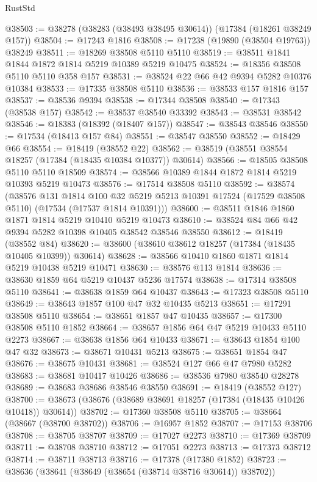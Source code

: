 \begin{lexlean}{RustStd}
\begin{coremodule}
@38503 := @38278 (@38283 (@38493 @38495 @30614)) (@17384 (@18261 @38249 @157))
@38504 := @17243 @1816
@38508 := @17238 (@19890 (@38504 @19763)) @38249
@38511 := @18269 @38508 @5110 @5110
@38519 := @38511 @1841 @1844 @1872 @1814 @5219 @10389 @5219 @10475
@38524 := @18356 @38508 @5110 @5110 @358 @157
@38531 := @38524 @22 @66 @42 @9394 @5282 @10376 @10384
@38533 := @17335 @38508 @5110
@38536 := @38533 @157 @1816 @157
@38537 := @38536 @9394
@38538 := @17344 @38508
@38540 := @17343 (@38538 @157)
@38542 := @38537 @38540 @33392
@38543 := @38531 @38542
@38546 := @18383 (@18392 (@18407 @157))
@38547 := @38543 @38546
@38550 := @17534 (@18413 @157 @84)
@38551 := @38547 @38550
@38552 := @18429 @66
@38554 := @18419 (@38552 @22)
@38562 := @38519 (@38551 @38554 @18257 (@17384 (@18435 @10384 @10377)) @30614)
@38566 := @18505 @38508 @5110 @5110 @18509
@38574 := @38566 @10389 @1844 @1872 @1814 @5219 @10393 @5219 @10473
@38576 := @17514 @38508 @5110
@38592 := @38574
    (@38576
      @131
      @1814
      @100
      @32
      @5219
      @5213
      @10391
      @17524
      (@17529 @38508 @5110)
      (@17534 (@17537 @1814 @10391)))
@38600 := @38511 @1846 @1860 @1871 @1814 @5219 @10410 @5219 @10473
@38610 := @38524 @84 @66 @42 @9394 @5282 @10398 @10405 @38542 @38546 @38550
@38612 := @18419 (@38552 @84)
@38620 := @38600 (@38610 @38612 @18257 (@17384 (@18435 @10405 @10399)) @30614)
@38628 := @38566 @10410 @1860 @1871 @1814 @5219 @10438 @5219 @10471
@38630 := @38576 @113 @1814
@38636 := @38630 @1859 @64 @5219 @10437 @5236 @17574
@38638 := @17314 @38508 @5110
@38641 := @38638 @1859 @64 @10437
@38643 := @17323 @38508 @5110
@38649 := @38643 @1857 @100 @47 @32 @10435 @5213
@38651 := @17291 @38508 @5110
@38654 := @38651 @1857 @47 @10435
@38657 := @17300 @38508 @5110 @1852
@38664 := @38657 @1856 @64 @47 @5219 @10433 @5110 @2273
@38667 := @38638 @1856 @64 @10433
@38671 := @38643 @1854 @100 @47 @32
@38673 := @38671 @10431 @5213
@38675 := @38651 @1854 @47
@38676 := @38675 @10431
@38681 := @38524 @127 @66 @47 @7980 @5282
@38683 := @38681 @10417 @10426
@38686 := @38536 @7980 @38540 @28278
@38689 := @38683 @38686 @38546 @38550
@38691 := @18419 (@38552 @127)
@38700 := @38673 (@38676 (@38689 @38691 @18257 (@17384 (@18435 @10426 @10418)) @30614))
@38702 := @17360 @38508 @5110
@38705 := @38664 (@38667 (@38700 @38702))
@38706 := @16957 @1852
@38707 := @17153 @38706
@38708 := @38705 @38707
@38709 := @17027 @2273
@38710 := @17369 @38709
@38711 := @38708 @38710
@38712 := @17051 @2273
@38713 := @17373 @38712
@38714 := @38711 @38713
@38716 := @17378 (@17380 @1852)
@38723 := @38636 (@38641 (@38649 (@38654 (@38714 @38716 @30614)) @38702))

\end{coremodule}
\end{lexlean}
